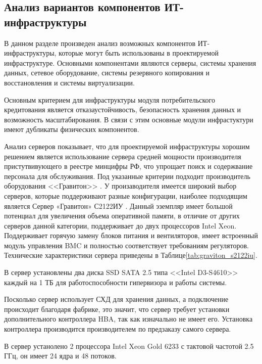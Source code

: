 \documentclass[14pt, a4paper]{extarticle}
\begin{document}
\subsection{Анализ вариантов компонентов ИТ-инфраструктуры}

В данном разделе произведен анализ возможных компонентов ИТ-инфраструктуры,
которые могут быть использованы в проектируемой инфраструктуре. Основными
компонентами являются серверы, системы хранения данных, сетевое оборудование,
системы резервного копирования и восстановления и системы виртуализации.

Основным критерием для инфраструктуры модуля потребительского кредитования
является отказаустойчивость, безопасность хранения данных и возможность
масштабирования. В связи с этим основные модули инфрастуктури имеют дубликаты
физических компонентов.

Анализ серверов показывает, что для проектируемой инфраструктуры хорошим решением
является использование сервера средней мощности производителя пристутвивующего
в реестре минцифры РФ, что упрощает поиск и содержвание персонала для
обслуживания. Под указанные критерии подходит производитель оборудования <<Гравитон>> \cite{graviton-site}.
У произаводителя имеется широкий выбор серверов, которые поддерживают
разные конфигурации, наиболее подходящим является Сервер «Гравитон» С2122ИУ \cite{graiton-server-s2122iu}.
Данный эземпляр имеет большой потенциал для увеличения объема оперативной памяти,
в отличие от других серверов данной категории, поддерживает до двух процессоров Intel
Xeon. Поддерживает горячую замену блоков питания и вентиляторов, имеет встроенный
модуль управления BMC и полностью соответствует требованиям регуляторов.
Технические характеристики сервера приведены в Таблице\;\ref{tab:graviton_s2122iu}.

В сервер установлены два диска SSD SATA 2.5 типа <<Intel D3-S4610>> каждый на 
1 ТБ для работоспособности гипервизора и работы системы.

Посколько сервер использует СХД для хранения данных, а подключение происходит
благодаря фабрике, это значит, что сервер требует установки дополнительного
контроллера HBA, так как изначально не имеет его. Установка контроллера 
производится производителем по предзаказу самого сервера.

В сервер устанолено 2 процессора Intel Xeon Gold 6233 с тактовой частотой 2.5 ГГц,
он имеет 24 ядра и 48 потоков.
\end{document}
